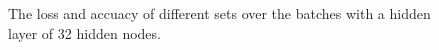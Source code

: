 \documentclass{article} %
\begin{document}
\begin{figure} [!htbp]
	
	\caption{The loss and accuacy of different sets over the batches with a hidden layer of 32 hidden nodes. }  
	
\end{figure}
\end{document}
